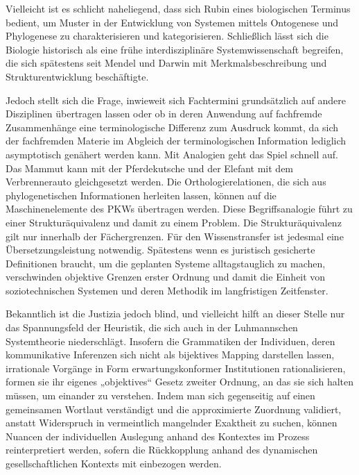 \documentclass[a4paper,11pt]{article}
\begin{document}
Vielleicht ist es schlicht naheliegend, dass sich Rubin eines biologischen
Terminus bedient, um Muster in der Entwicklung von Systemen mittels Ontogenese
und Phylogenese zu charakterisieren und kategorisieren. Schließlich lässt sich
die Biologie historisch als eine frühe interdisziplinäre Systemwissenschaft
begreifen, die sich spätestens seit Mendel und Darwin mit Merkmalsbeschreibung
und Strukturentwicklung beschäftigte.

Jedoch stellt sich die Frage, inwieweit sich Fachtermini grundsätzlich auf
andere Disziplinen übertragen lassen oder ob in deren Anwendung auf fachfremde
Zusammenhänge eine terminologische Differenz zum Ausdruck kommt, da sich der
fachfremden Materie im Abgleich der terminologischen Information lediglich
asymptotisch genähert werden kann. Mit Analogien geht das Spiel schnell
auf. Das Mammut kann mit der Pferdekutsche und der Elefant mit dem
Verbrennerauto gleichgesetzt werden. Die Orthologierelationen, die sich aus
phylogenetischen Informationen herleiten lassen, können auf die
Maschinenelemente des PKWs übertragen werden. Diese Begriffsanalogie führt zu
einer Strukturäquivalenz und damit zu einem Problem. Die Strukturäquivalenz
gilt nur innerhalb der Fächergrenzen. Für den Wissenstransfer ist jedesmal
eine Übersetzungsleistung notwendig. Spätestens wenn es juristisch gesicherte
Definitionen braucht, um die geplanten Systeme alltagstauglich zu machen,
verschwinden objektive Grenzen erster Ordnung und damit die Einheit von
soziotechnischen Systemen und deren Methodik im langfristigen Zeitfenster.

Bekanntlich ist die Justizia jedoch blind, und vielleicht hilft an dieser
Stelle nur das Spannungsfeld der Heuristik, die sich auch in der Luhmannschen
Systemtheorie niederschlägt. Insofern die Grammatiken der Individuen, deren
kommunikative Inferenzen sich nicht als bijektives Mapping darstellen lassen,
irrationale Vorgänge in Form erwartungskonformer Institutionen
rationalisieren, formen sie ihr eigenes „objektives“ Gesetz zweiter Ordnung,
an das sie sich halten müssen, um einander zu verstehen. Indem man sich
gegenseitig auf einen gemeinsamen Wortlaut verständigt und die approximierte
Zuordnung validiert, anstatt Widerspruch in vermeintlich mangelnder Exaktheit
zu suchen, können Nuancen der individuellen Auslegung anhand des Kontextes im
Prozess reinterpretiert werden, sofern die Rückkopplung anhand des dynamischen
gesellschaftlichen Kontexts mit einbezogen werden.
\end{document}
